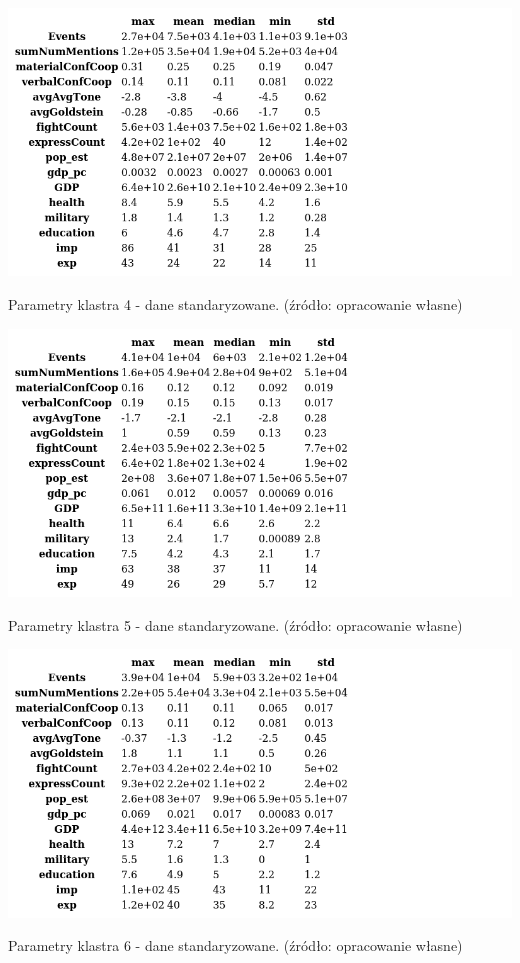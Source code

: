 \documentclass[11pt]{report}
\begin{document}
    \begin{table}[!htp]
        \centering
        \includegraphics[width=\linewidth]{tables/CLUST/desc/clust4std_desc.png}
        \caption{Parametry klastra 4 - dane standaryzowane. (źródło: opracowanie własne)}
        \label{tab:cl4std_desc}
    \end{table}

    \begin{table}[!htp]
        \centering
        \includegraphics[width=\linewidth]{tables/CLUST/desc/clust5std_desc.png}
        \caption{Parametry klastra 5 - dane standaryzowane. (źródło: opracowanie własne)}
        \label{tab:cl5std_desc}
    \end{table}

    \begin{table}[!htp]
        \centering
        \includegraphics[width=\linewidth]{tables/CLUST/desc/clust6std_desc.png}
        \caption{Parametry klastra 6 - dane standaryzowane. (źródło: opracowanie własne)}
        \label{tab:cl6std_desc}
    \end{table}
\end{document}
